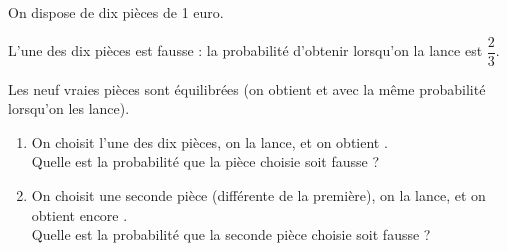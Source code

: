 \begin{corr}
\end{corr}

\begin{exo}[Exercice 7]
On dispose de dix pièces de 1 euro.

L'une des dix pièces est fausse : la probabilité d'obtenir  lorsqu'on la lance est \(\dfrac{2}{3}\).

Les neuf vraies pièces sont équilibrées (on obtient  et  avec la même probabilité lorsqu'on les lance).

\begin{enumerate}
    \item On choisit l'une des dix pièces, on la lance, et on obtient . \\ Quelle est la probabilité que la pièce choisie soit fausse ? \\
    \item On choisit une seconde pièce (différente de la première), on la lance, et on obtient encore . \\ Quelle est la probabilité que la seconde pièce choisie soit fausse ?
\end{enumerate}
\end{exo}

\begin{corr}
\end{corr}

